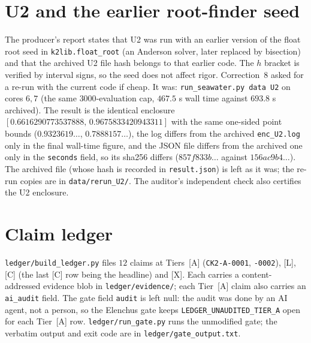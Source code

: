 \documentclass[10pt]{article}
\newcommand{\tier}[1]{\textsf{[#1]}}
\newcommand{\tA}{\tier{A}}
\newcommand{\tL}{\tier{L}}
\newcommand{\tC}{\tier{C}}
\newcommand{\tX}{\tier{X}}
\begin{document}
\section{U2 and the earlier root-finder seed}\label{sec:u2}
The producer's report states that U2 was run with an earlier version of the float root seed in \texttt{k2lib.float\_root} (an Anderson solver, later replaced by bisection) and that the archived U2 file hash belongs to that earlier code. The $h$ bracket is verified by interval signs, so the seed does not affect rigor. Correction~8 asked for a re-run with the current code if cheap. It was: \texttt{run\_seawater.py data U2} on cores $6,7$ (the same $3000$-evaluation cap, $467.5$ s wall time against $693.8$ s archived). The result is the identical enclosure $[0.6616290773537888,\,0.9675833420943311]$ with the same one-sided point bounds ($0.9323619\ldots$, $0.7888157\ldots$), the log differs from the archived \texttt{enc\_U2.log} only in the final wall-time figure, and the JSON file differs from the archived one only in the \texttt{seconds} field, so its sha256 differs ($857f833b\ldots$ against $156ac9b4\ldots$). The archived file (whose hash is recorded in \texttt{result.json}) is left as it was; the re-run copies are in \texttt{data/rerun\_U2/}. The auditor's independent check also certifies the U2 enclosure.

\section{Claim ledger}\label{sec:ledger}
\texttt{ledger/build\_ledger.py} files $12$ claims at Tiers~\tA{} (\texttt{CK2-A-0001}, \texttt{-0002}), \tL{}, \tC{} (the last \tC{} row being the headline) and \tX{}. Each carries a content-addressed evidence blob in \texttt{ledger/evidence/}; each Tier~\tA{} claim also carries an \texttt{ai\_audit} field. The gate field \texttt{audit} is left null: the audit was done by an AI agent, not a person, so the Elenchus gate keeps \texttt{LEDGER\_UNAUDITED\_TIER\_A} open for each Tier~\tA{} row. \texttt{ledger/run\_gate.py} runs the unmodified gate; the verbatim output and exit code are in \texttt{ledger/gate\_output.txt}.

\end{document}
